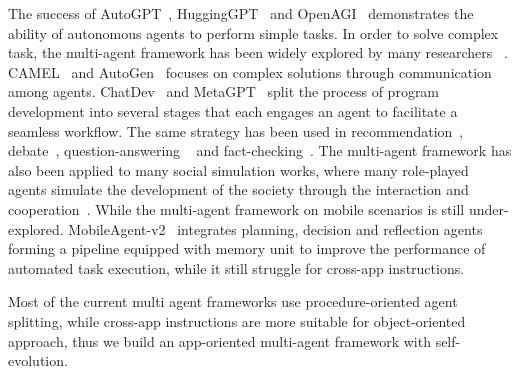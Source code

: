 The success of AutoGPT~\cite{autogpt}, HuggingGPT~\cite{shen2024hugginggpt} and OpenAGI~\cite{ge2024openagi} demonstrates the ability of autonomous agents to perform simple tasks.
In order to solve complex task, the multi-agent framework has been widely explored by many researchers ~\cite{guo2024large}. 
CAMEL~\cite{li2023camel} and AutoGen~\cite{wu2023autogen} focuses on complex solutions through communication among agents.
ChatDev~\cite{qian2023communicative} and MetaGPT~\cite{hongmetagpt} split the process of program development into several stages that each engages an agent to facilitate a seamless workflow. The same strategy has been used in recommendation~\cite{wang2024multi, zhang2024generative}, debate~\cite{du2023improving,chan2023chateval}, question-answering ~\cite{sun2024harnessing} and fact-checking~\cite{kim2024can, liu2025bidev}. 
The multi-agent framework has also been applied to many social simulation works, where many role-played agents simulate the development of the society through the interaction and cooperation~\cite{park2023generative, zhang2023exploring, kaiya2023lyfe, liu2024skepticism, liu2024tiny}.
While the multi-agent framework on mobile scenarios is still under-explored. MobileAgent-v2~\cite{wang2024mobilev2} integrates planning, decision and reflection agents forming a pipeline equipped with memory unit to improve the performance of automated task execution, while it still struggle for cross-app instructions.

Most of the current multi agent frameworks use procedure-oriented agent splitting, while cross-app instructions are more suitable for object-oriented approach, thus we build an app-oriented multi-agent framework with self-evolution.